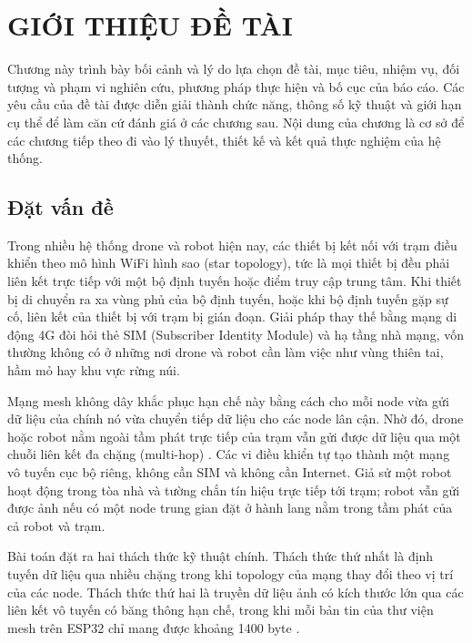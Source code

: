 \chapter{GIỚI THIỆU ĐỀ TÀI}\label{chap:1}

Chương này trình bày bối cảnh và lý do lựa chọn đề tài, mục tiêu, nhiệm vụ, đối tượng và phạm vi nghiên cứu, phương pháp thực hiện và bố cục của báo cáo. Các yêu cầu của đề tài được diễn giải thành chức năng, thông số kỹ thuật và giới hạn cụ thể để làm căn cứ đánh giá ở các chương sau. Nội dung của chương là cơ sở để các chương tiếp theo đi vào lý thuyết, thiết kế và kết quả thực nghiệm của hệ thống.


\section{Đặt vấn đề}\label{sec:1.1}

Trong nhiều hệ thống drone và robot hiện nay, các thiết bị kết nối với trạm điều khiển theo mô hình WiFi hình sao (star topology), tức là mọi thiết bị đều phải liên kết trực tiếp với một bộ định tuyến hoặc điểm truy cập trung tâm. Khi thiết bị di chuyển ra xa vùng phủ của bộ định tuyến, hoặc khi bộ định tuyến gặp sự cố, liên kết của thiết bị với trạm bị gián đoạn. Giải pháp thay thế bằng mạng di động 4G đòi hỏi thẻ SIM (Subscriber Identity Module) và hạ tầng nhà mạng, vốn thường không có ở những nơi drone và robot cần làm việc như vùng thiên tai, hầm mỏ hay khu vực rừng núi.

Mạng mesh không dây khắc phục hạn chế này bằng cách cho mỗi node vừa gửi dữ liệu của chính nó vừa chuyển tiếp dữ liệu cho các node lân cận. Nhờ đó, drone hoặc robot nằm ngoài tầm phát trực tiếp của trạm vẫn gửi được dữ liệu qua một chuỗi liên kết đa chặng (multi-hop) \citep{akyildiz2005,bekmezci2013}. Các vi điều khiển tự tạo thành một mạng vô tuyến cục bộ riêng, không cần SIM và không cần Internet. Giả sử một robot hoạt động trong tòa nhà và tường chắn tín hiệu trực tiếp tới trạm; robot vẫn gửi được ảnh nếu có một node trung gian đặt ở hành lang nằm trong tầm phát của cả robot và trạm.

Bài toán đặt ra hai thách thức kỹ thuật chính. Thách thức thứ nhất là định tuyến dữ liệu qua nhiều chặng trong khi topology của mạng thay đổi theo vị trí của các node. Thách thức thứ hai là truyền dữ liệu ảnh có kích thước lớn qua các liên kết vô tuyến có băng thông hạn chế, trong khi mỗi bản tin của thư viện mesh trên ESP32 chỉ mang được khoảng 1400 byte \citep{painlessmesh}.

